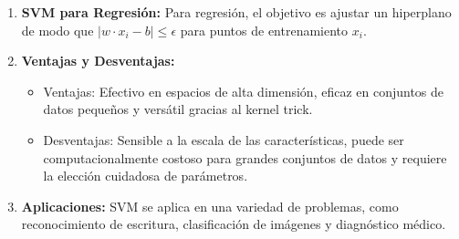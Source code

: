 \documentclass{book}
\begin{document}
\begin{enumerate}
    \item \textbf{SVM para Regresión:}
        Para regresión, el objetivo es ajustar un hiperplano de modo que \(|w \cdot x_i - b| \leq \epsilon\) para puntos de entrenamiento \(x_i\).

    \item \textbf{Ventajas y Desventajas:}
        \begin{itemize}
            \item Ventajas: Efectivo en espacios de alta dimensión, eficaz en conjuntos de datos pequeños y versátil gracias al kernel trick.
            \item Desventajas: Sensible a la escala de las características, puede ser computacionalmente costoso para grandes conjuntos de datos y requiere la elección cuidadosa de parámetros.
        \end{itemize}

    \item \textbf{Aplicaciones:}
        SVM se aplica en una variedad de problemas, como reconocimiento de escritura, clasificación de imágenes y diagnóstico médico.
\end{enumerate}
    
    
  
\end{document}
